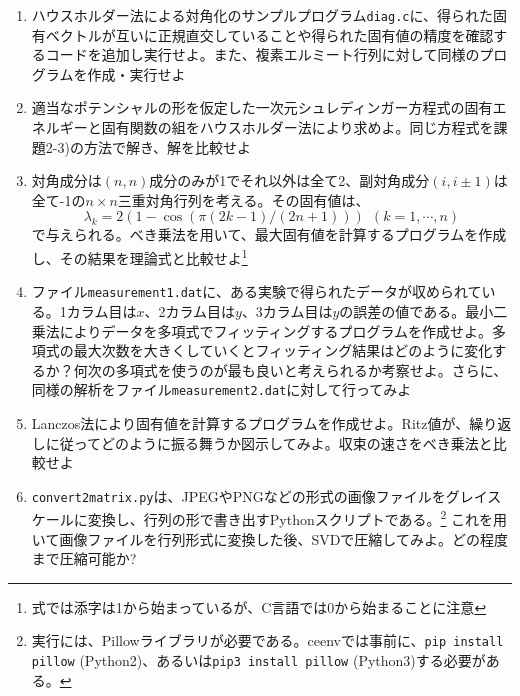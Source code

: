 \documentclass[11pt]{jarticle}
\begin{document}
\noindent {\bf [対角化]}
\begin{enumerate}
\renewcommand{\labelenumi}{4-\arabic{enumi})}
    
\item ハウスホルダー法による対角化のサンプルプログラム{\tt diag.c}に、得られた固有ベクトルが互いに正規直交していることや得られた固有値の精度を確認するコードを追加し実行せよ。また、複素エルミート行列に対して同様のプログラムを作成・実行せよ

\item 適当なポテンシャルの形を仮定した一次元シュレディンガー方程式の固有エネルギーと固有関数の組をハウスホルダー法により求めよ。同じ方程式を課題2-3)の方法で解き、解を比較せよ

\item 対角成分は$(n,n)$成分のみが1でそれ以外は全て2、副対角成分$(i, i \pm 1)$は全て-1の$n \times n$三重対角行列を考える。その固有値は、
  \[ \lambda_k = 2 (1 - \cos (\pi (2 k - 1) / (2 n + 1))) \ \ (k=1,\cdots,n)\]
  で与えられる。べき乗法を用いて、最大固有値を計算するプログラムを作成し、その結果を理論式と比較せよ\footnote{式では添字は1から始まっているが、C言語では0から始まることに注意}

\item ファイル{\tt measurement1.dat}に、ある実験で得られたデータが収められている。1カラム目は$x$、2カラム目は$y$、3カラム目は$y$の誤差の値である。最小二乗法によりデータを多項式でフィッティングするプログラムを作成せよ。多項式の最大次数を大きくしていくとフィッティング結果はどのように変化するか？何次の多項式を使うのが最も良いと考えられるか考察せよ。さらに、同様の解析をファイル{\tt measurement2.dat}に対して行ってみよ

\item Lanczos法により固有値を計算するプログラムを作成せよ。Ritz値が、繰り返しに従ってどのように振る舞うか図示してみよ。収束の速さをべき乗法と比較せよ

\item {\tt convert2matrix.py}は、JPEGやPNGなどの形式の画像ファイルをグレイスケールに変換し、行列の形で書き出すPythonスクリプトである。\footnote{実行には、Pillowライブラリが必要である。ceenvでは事前に、{\tt pip install pillow} (Python2)、あるいは{\tt pip3 install pillow} (Python3)する必要がある。} これを用いて画像ファイルを行列形式に変換した後、SVDで圧縮してみよ。どの程度まで圧縮可能か?


\end{enumerate}
\end{document}
